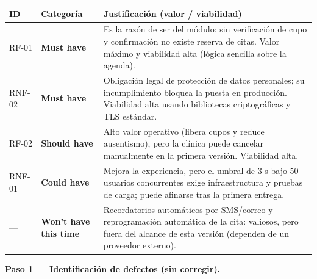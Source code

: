 \documentclass[11pt,a4paper,oneside]{article}
\begin{document}
	{\footnotesize
		\begin{center}
			\begin{tabularx}{\textwidth}{|C{1.4cm}|C{2.6cm}|Y|}
				\hline
				\textbf{ID} & \textbf{Categoría} & \textbf{Justificación (valor / viabilidad)} \\ \hline
				RF-01 & \textbf{Must have} & Es la razón de ser del módulo: sin verificación de cupo y confirmación no existe reserva de citas. Valor máximo y viabilidad alta (lógica sencilla sobre la agenda). \\ \hline
				RNF-02 & \textbf{Must have} & Obligación legal de protección de datos personales; su incumplimiento bloquea la puesta en producción. Viabilidad alta usando bibliotecas criptográficas y TLS estándar. \\ \hline
				RF-02 & \textbf{Should have} & Alto valor operativo (libera cupos y reduce ausentismo), pero la clínica puede cancelar manualmente en la primera versión. Viabilidad alta. \\ \hline
				RNF-01 & \textbf{Could have} & Mejora la experiencia, pero el umbral de 3 s bajo 50 usuarios concurrentes exige infraestructura y pruebas de carga; puede afinarse tras la primera entrega. \\ \hline
				--- & \textbf{Won't have this time} & Recordatorios automáticos por SMS/correo y reprogramación automática de la cita: valiosos, pero fuera del alcance de esta versión (dependen de un proveedor externo). \\ \hline
			\end{tabularx}
	\end{center}}
	
    \newpage
	
	\vspace{10pt}
	\vspace{4pt}
	
	\noindent\textbf{Paso 1 — Identificación de defectos (sin corregir).}
	
\end{document}
